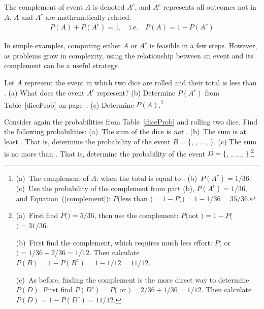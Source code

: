 \begin{termBox}{
The complement of event $A$ is denoted $A^c$, and $A^c$ represents all outcomes not in~$A$. $A$ and $A^c$ are mathematically related: \vspace{-2mm}
\begin{eqnarray}\label{complement}
P(A) + P(A^c) = 1, \quad\text{i.e.}\quad P(A) = 1-P(A^c)
\end{eqnarray}\vspace{-6.5mm}}
\end{termBox}

In simple examples, computing either $A$ or $A^c$ is feasible in a few steps. However, as problems grow in complexity, using the relationship between an event and its complement can be a useful strategy.

\begin{exercise}
Let $A$ represent the event in which two dice are rolled and their total is less than . (a) What does the event $A^c$ represent? (b) Determine $P(A^c)$ from Table~\ref{diceProb} on page~\pageref{diceProb}. (c) Determine $P(A)$.\footnote{(a)~The complement of $A$: when the total is equal to . (b)~$P(A^c) = 1/36$. (c)~Use the probability of the complement from part (b), $P(A^c) = 1/36$, and Equation~(\ref{complement}): $P($less than $) = 1 - P($$) = 1 - 1/36 = 35/36$.}
\end{exercise}

\begin{exercise} Consider again the probabilities from Table~\ref{diceProb} and rolling two dice. Find the following probabilities: (a)~The sum of the dice is \emph{not} . (b)~The sum is at least . That is, determine the probability of the event $B=\{$, , ..., $\}$. (c) The sum is no more than . That is, determine the probability of the event $D=\{$, , ..., $\}$.\footnote{(a)~First find $P($$)=5/36$, then use the complement: $P($not $) = 1 - P($$) = 31/36$.

(b)~First find  the complement, which requires much less effort: $P($ or $)=1/36+2/36=1/12$. Then calculate $P(B) = 1-P(B^c) = 1-1/12 = 11/12$.

(c)~As before, finding the complement is the more direct way to determine $P(D)$. First find $P(D^c) = P($ or $)=2/36 + 1/36=1/12$. Then calculate $P(D) = 1 - P(D^c) = 11/12$.}
\end{exercise}


